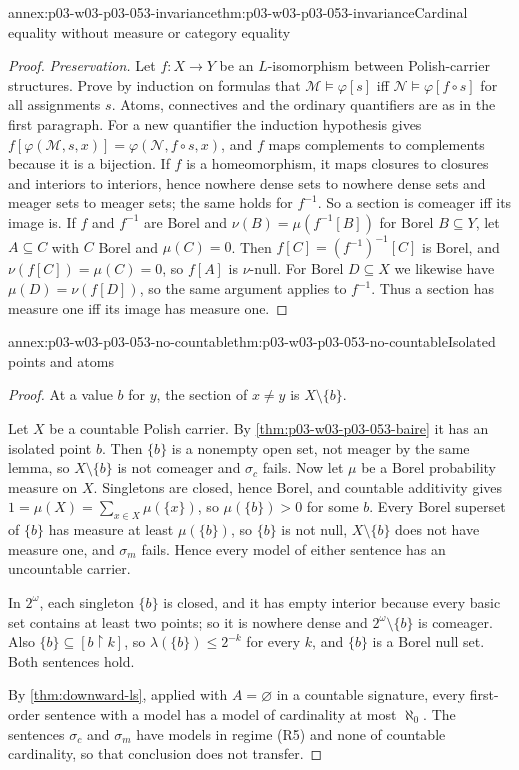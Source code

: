 \begin{annexitem}{annex:p03-w03-p03-053-invariance}{thm:p03-w03-p03-053-invariance}{Cardinal equality without measure or category equality}
\begin{proof}
\emph{Preservation.} Let \(f:X\to Y\) be an \(L\)-isomorphism between
Polish-carrier structures. Prove by induction on formulas that
\(\mathcal M\models\varphi[s]\) iff \(\mathcal N\models\varphi[f\circ s]\)
for all assignments \(s\). Atoms, connectives and the ordinary quantifiers
are as in the first paragraph. For a new quantifier the induction
hypothesis gives \(f[\varphi(\mathcal M,s,x)]=\varphi(\mathcal N,f\circ s,x)\),
and \(f\) maps complements to complements because it is a bijection.
If \(f\) is a homeomorphism, it maps closures to closures and interiors to
interiors, hence nowhere dense sets to nowhere dense sets and meager sets
to meager sets; the same holds for \(f^{-1}\). So a section is comeager
iff its image is. If \(f\) and \(f^{-1}\) are Borel and
\(\nu(B)=\mu(f^{-1}[B])\) for Borel \(B\subseteq Y\), let \(A\subseteq C\)
with \(C\) Borel and \(\mu(C)=0\). Then \(f[C]=(f^{-1})^{-1}[C]\) is
Borel, and \(\nu(f[C])=\mu(C)=0\), so \(f[A]\) is \(\nu\)-null. For Borel
\(D\subseteq X\) we likewise have \(\mu(D)=\nu(f[D])\), so the same
argument applies to \(f^{-1}\). Thus a section has measure one iff its
image has measure one.
\end{proof}
\end{annexitem}

\begin{annexitem}{annex:p03-w03-p03-053-no-countable}{thm:p03-w03-p03-053-no-countable}{Isolated points and atoms}
\begin{proof}
At a value \(b\) for \(y\), the section of \(x\neq y\) is
\(X\setminus\{b\}\).

Let \(X\) be a countable Polish carrier. By
\cref{thm:p03-w03-p03-053-baire} it has an isolated point \(b\). Then
\(\{b\}\) is a nonempty open set, not meager by the same lemma, so
\(X\setminus\{b\}\) is not comeager and \(\sigma_c\) fails. Now let
\(\mu\) be a Borel probability measure on \(X\). Singletons are closed,
hence Borel, and countable additivity gives
\(1=\mu(X)=\sum_{x\in X}\mu(\{x\})\), so \(\mu(\{b\})>0\) for some \(b\).
Every Borel superset of \(\{b\}\) has measure at least \(\mu(\{b\})\),
so \(\{b\}\) is not null, \(X\setminus\{b\}\) does not have measure one,
and \(\sigma_m\) fails. Hence every model of either sentence has an
uncountable carrier.

In \(2^\omega\), each singleton \(\{b\}\) is closed, and it has empty
interior because every basic set contains at least two points; so it is
nowhere dense and \(2^\omega\setminus\{b\}\) is comeager. Also
\(\{b\}\subseteq[b\restriction k]\), so
\(\lambda(\{b\})\le2^{-k}\) for every \(k\), and \(\{b\}\) is a Borel null
set. Both sentences hold.

By \cref{thm:downward-ls}, applied with \(A=\varnothing\) in a
countable signature, every first-order sentence with a model has a model
of cardinality at most \(\aleph_0\). The sentences \(\sigma_c\) and
\(\sigma_m\) have models in regime (R5) and none of countable
cardinality, so that conclusion does not transfer.
\end{proof}
\end{annexitem}

